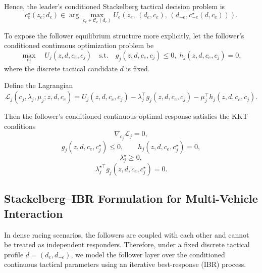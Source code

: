 \documentclass[final ,3p, times]{elsarticle}
\begin{document}
Hence, the leader's conditioned Stackelberg tactical decision problem is
\begin{equation}
c_e^\star(z_e;d_e)
\in
\arg\max_{c_e \in \mathcal{C}_e(d_e)}
U_e\!\left(
z_e,\,
(d_e,c_e),\,
(d_{-e},c_{-e}^\star(d,c_e))
\right).
\label{eq:leader_stackelberg}
\end{equation}

To expose the follower equilibrium structure more explicitly, let the follower's conditioned continuous optimization problem be
\begin{equation}
\max_{c_j}
\quad
U_j(z,d,c_e,c_j)
\quad
\text{s.t.}
\quad
g_j(z,d,c_e,c_j)\le 0,\;
h_j(z,d,c_e,c_j)=0,
\label{eq:follower_constrained_problem}
\end{equation}
where the discrete tactical candidate $d$ is fixed.

Define the Lagrangian
\begin{equation}
\mathcal{L}_j(c_j,\lambda_j,\mu_j;z,d,c_e)
=
U_j(z,d,c_e,c_j)
-
\lambda_j^\top g_j(z,d,c_e,c_j)
-
\mu_j^\top h_j(z,d,c_e,c_j).
\label{eq:follower_lagrangian}
\end{equation}

Then the follower's conditioned continuous optimal response satisfies the KKT conditions
\begin{equation}
\nabla_{c_j}\mathcal{L}_j = 0,
\label{eq:kkt_stationarity}
\end{equation}
\begin{equation}
g_j(z,d,c_e,c_j^\star)\le 0,\qquad
h_j(z,d,c_e,c_j^\star)=0,
\label{eq:kkt_primal_feasibility}
\end{equation}
\begin{equation}
\lambda_j^\star \ge 0,
\label{eq:kkt_dual_feasibility}
\end{equation}
\begin{equation}
\lambda_j^{\star\top} g_j(z,d,c_e,c_j^\star)=0.
\label{eq:kkt_complementarity}
\end{equation}


\subsection{Stackelberg--IBR Formulation for Multi-Vehicle Interaction}
\label{subsec:stackelberg_ibr}

In dense racing scenarios, the followers are coupled with each other and cannot be treated as independent responders. Therefore, under a fixed discrete tactical profile $d=(d_e,d_{-e})$, we model the follower layer over the conditioned continuous tactical parameters using an iterative best-response (IBR) process.
\end{document}
